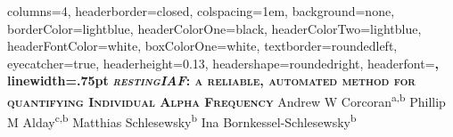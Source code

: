 \documentclass[landscape,a0paper,fontscale=.235]{xebaposter} %
\begin{document}
\begin{poster}
{
columns=4, %
headerborder=closed, %
colspacing=1em, %
background=none, %
borderColor=lightblue, %
headerColorOne=black, %
headerColorTwo=lightblue, %
headerFontColor=white, %
boxColorOne=white, %
textborder=roundedleft, %
eyecatcher=true, %
headerheight=0.13\textheight, %
headershape=roundedright, %
headerfont=\Large\bf\textsc, %
linewidth=.75pt %
}
{
\setlength\fboxsep{0pt}
\setlength\fboxrule{0pt}
}
{\bf\textsc{\emph{restingIAF}: a reliable, automated method for quantifying Individual Alpha Frequency}\vspace{.2em}} %
{\smaller Andrew W Corcoran\textsuperscript{a,b} Phillip M Alday\textsuperscript{c,b} Matthias Schlesewsky\textsuperscript{b} Ina Bornkessel-Schlesewsky\textsuperscript{b}} %
{
\setlength\fboxsep{0pt}
\setlength\fboxrule{0pt}
}



\end{poster}
\end{document}
